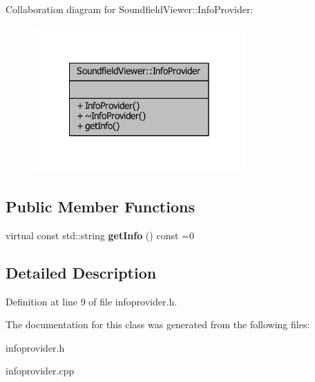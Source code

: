 Collaboration diagram for Soundfield\-Viewer\-:\-:Info\-Provider\-:\nopagebreak
\begin{figure}[H]
\begin{center}
\leavevmode
\includegraphics[width=230pt]{d8/d42/classSoundfieldViewer_1_1InfoProvider__coll__graph}
\end{center}
\end{figure}
\subsection*{Public Member Functions}
\begin{DoxyCompactItemize}
\item 
virtual const std\-::string {\bfseries get\-Info} () const =0\label{classSoundfieldViewer_1_1InfoProvider_a31dd43c3ab43b6c61e77de7cb8496c0b}

\end{DoxyCompactItemize}


\subsection{Detailed Description}


Definition at line 9 of file infoprovider.\-h.



The documentation for this class was generated from the following files\-:\begin{DoxyCompactItemize}
\item 
infoprovider.\-h\item 
infoprovider.\-cpp\end{DoxyCompactItemize}

